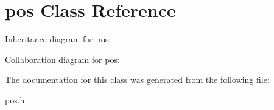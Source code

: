 \hypertarget{classpos}{}\section{pos Class Reference}
\label{classpos}


Inheritance diagram for pos\+:


Collaboration diagram for pos\+:


The documentation for this class was generated from the following file\+:\begin{DoxyCompactItemize}
\item 
pos.\+h\end{DoxyCompactItemize}
